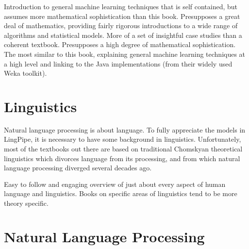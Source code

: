 \begin{itemize}
%
{Introduction to general machine learning
techniques that is self contained, but assumes more mathematical
sophistication than this book.}
%
{Presupposes a great deal of mathematics, providing
fairly rigorous introductions to a wide range of algorithms and
statistical models.}
%
{More of a set of insightful case studies than a coherent textbook.
Presupposes a high degree of mathematical sophistication.}
%
{The most similar to this book, explaining general machine
learning techniques at a high level and 
linking to the Java implementations (from their widely used Weka toolkit).}
%
\end{itemize}




\section{Linguistics}

\noindent
Natural language processing is about language.  To fully appreciate
the models in LingPipe, it is necessary to have some background in
linguistics.  Unfortunately, most of the textbooks out there are based
on traditional Chomskyan theoretical linguistics which divorces
language from its processing, and from which natural language
processing diverged several decades ago.

\begin{itemize}
%
{Easy to follow and engaging overview of just about every
aspect of human language and linguistics.  Books on specific areas of
linguistics tend to be more theory specific.}
%
\end{itemize}


\section{Natural Language Processing}

